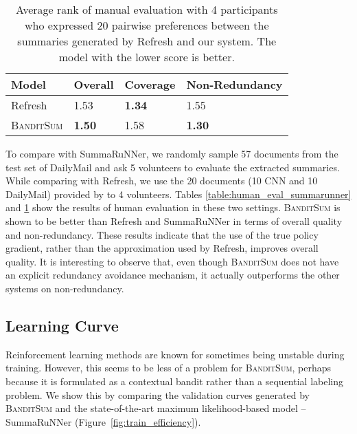 \documentclass[11pt,a4paper]{article}
\newcommand{\B}{\textsc{BanditSum }}
\newcommand{\Bnospace}{\textsc{BanditSum}}
\begin{document}
\begin{table}[h!]
\small
\begin{center}
\begin{tabularx}{\columnwidth}{|l|X|X|X|}
\hline
Model & Overall & Coverage & Non-Redundancy \\ \hline
Refresh & 1.53 &\textbf{1.34}  & 1.55  \\ \hline
\B & \textbf{1.50} & 1.58 & \textbf{1.30} \\ \hline
\end{tabularx}
\end{center}
\caption{Average rank of manual evaluation with 4 participants who expressed 20 pairwise preferences between the summaries generated by Refresh and our system. The model with the lower score is better.}
\label{table:human_eval_refresh}
\end{table}

To compare with SummaRuNNer, we randomly sample 57 documents from the test set of DailyMail and ask 5 volunteers to evaluate the extracted summaries.
While comparing with Refresh, we use the 20 documents (10 CNN and 10 DailyMail) provided by \citet{DBLP:Narayan/2018} to 4 volunteers. Tables \ref{table:human_eval_summarunner} and \ref{table:human_eval_refresh} show the results of human evaluation in these two settings. \B is shown to be better than Refresh and SummaRuNNer in terms of overall quality and non-redundancy. These results indicate that the use of the true policy gradient, rather than the approximation used by Refresh, improves overall quality. It is interesting to observe that, even though \B does not have an explicit redundancy avoidance mechanism, it actually outperforms the other systems on non-redundancy.



 


















\subsection{Learning Curve}
Reinforcement learning methods are known for sometimes being unstable during training. However, this seems to be less of a problem for \Bnospace, perhaps because it is formulated as a contextual bandit rather than a sequential labeling problem. We show this by comparing the validation curves generated by \B and the state-of-the-art maximum likelihood-based model -- SummaRuNNer \citep{ext5_summarunner} (Figure~\ref{fig:train_efficiency}).
\end{document}
